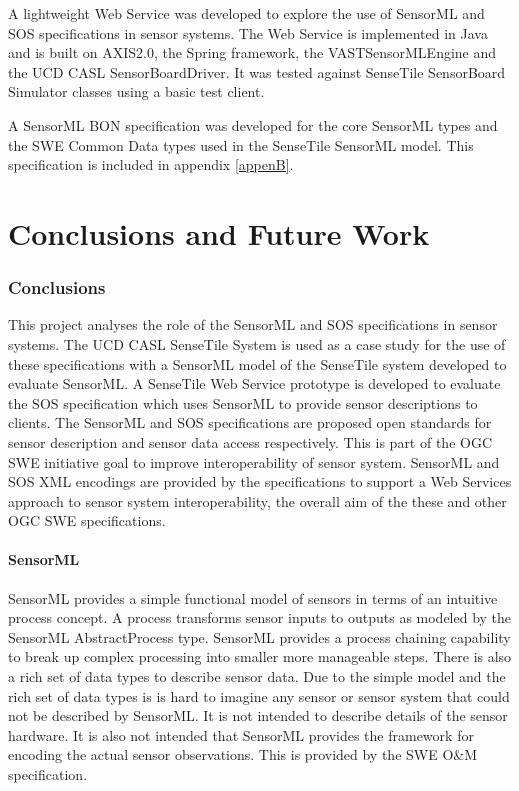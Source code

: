 \documentclass[]{final_report}
\begin{document}
A lightweight Web Service was developed to explore the use of SensorML and SOS specifications in sensor systems. The Web Service is implemented in Java and is built on AXIS2.0, the Spring framework, the VASTSensorMLEngine and the UCD CASL SensorBoardDriver. It was tested against SenseTile SensorBoard Simulator classes using a basic test client.

A SensorML BON specification was developed for the core SensorML types and the SWE Common Data types used in the SenseTile SensorML model. This specification is included in appendix \ref{appenB}.

\chapter{ Conclusions and Future Work}
\subsection{Conclusions}
This project analyses the role of the SensorML and SOS specifications in sensor systems. The UCD CASL SenseTile System is used as a case study for the use of these specifications with a SensorML model of the SenseTile system developed to evaluate SensorML. A SenseTile Web Service prototype is developed to evaluate the SOS specification which uses SensorML to provide sensor descriptions to clients. The SensorML and SOS specifications are proposed open standards for sensor description and sensor data access respectively. This is part of the OGC SWE initiative goal to improve interoperability of sensor system. SensorML and SOS XML encodings are provided by the specifications to support a Web Services approach to sensor system interoperability, the overall aim of the these and other OGC SWE specifications.

\subsubsection{SensorML}
SensorML provides a simple functional model of sensors in terms of an intuitive process concept. A process transforms sensor inputs to outputs as modeled by the SensorML AbstractProcess type. SensorML provides a process chaining capability to break up complex processing into smaller more manageable steps. There is also a rich set of data types to describe sensor data. Due to the simple model and the rich set of data types is is hard to imagine any sensor or sensor system that could not be described by SensorML. It is not intended to describe details of the sensor hardware. It is also not intended that SensorML provides the framework for encoding the actual sensor observations. This is provided by the SWE O\&M specification.
\end{document}
